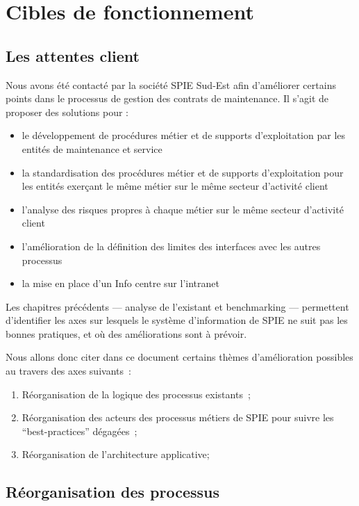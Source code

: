 \chapter{Cibles de fonctionnement}

\section{Les attentes client}

Nous avons été contacté par la société SPIE Sud-Est afin d'améliorer certains points dans le processus de gestion des contrats de maintenance. Il s'agit de proposer des solutions pour :

\begin{itemize}
    \item le développement de procédures métier et de supports d'exploitation par les entités de maintenance et service
    \item la standardisation des procédures métier et de supports d'exploitation pour les entités exerçant le même métier sur le même secteur d'activité client
    \item l'analyse des risques propres à chaque métier sur le même secteur d'activité client
    \item l'amélioration de la définition des limites des interfaces avec les autres processus
    \item la mise en place d'un Info centre sur l'intranet
\end{itemize}

Les chapitres précédents --- analyse de l'existant et benchmarking --- permettent d'identifier les axes sur lesquels le système d'information de SPIE ne suit pas les bonnes pratiques, et où des améliorations sont à prévoir.

    Nous allons donc citer dans ce document certains thèmes d'amélioration possibles au travers des axes suivants~:

    \begin{enumerate}
        \item Réorganisation de la logique des processus existants~;
        \item Réorganisation des acteurs des processus métiers de SPIE pour suivre les ``best-practices'' dégagées~;
        \item Réorganisation de l'architecture applicative;
    \end{enumerate}

\section{Réorganisation des processus}

